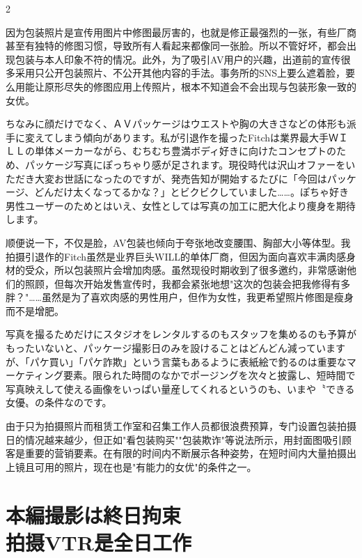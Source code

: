 \documentclass[12pt,UTF8]{ctexbook}
\begin{document}
\begin{paracol}{2}
\switchcolumn

因为包装照片是宣传用图片中修图最厉害的，也就是修正最强烈的一张，有些厂商甚至有独特的修图习惯，导致所有人看起来都像同一张脸。所以不管好坏，都会出现包装与本人印象不符的情况。此外，为了吸引AV用户的兴趣，出道前的宣传很多采用只公开包装照片、不公开其他内容的手法。事务所的SNS上要么遮着脸，要么用能让原形尽失的修图应用上传照片，根本不知道会不会出现与包装形象一致的女优。

\switchcolumn*

ちなみに顔だけでなく、ＡＶパッケージはウエストや胸の大きさなどの体形も派手に変えてしまう傾向があります。私が引退作を撮ったFitchは業界最大手ＷＩＬＬの単体メーカーながら、むちむち豊満ボディ好きに向けたコンセプトのため、パッケージ写真にぽっちゃり感が足されます。現役時代は沢山オファーをいただき大変お世話になったのですが、発売告知が開始するたびに「今回はパッケージ、どんだけ太くなってるかな？」とビクビクしていました……。ぽちゃ好き男性ユーザーのためとはいえ、女性としては写真の加工に肥大化より痩身を期待します。

\switchcolumn

顺便说一下，不仅是脸，AV包装也倾向于夸张地改变腰围、胸部大小等体型。我拍摄引退作的Fitch虽然是业界巨头WILL的单体厂商，但因为面向喜欢丰满肉感身材的受众，所以包装照片会增加肉感。虽然现役时期收到了很多邀约，非常感谢他们的照顾，但每次开始发售宣传时，我都会紧张地想"这次的包装会把我修得有多胖？"……虽然是为了喜欢肉感的男性用户，但作为女性，我更希望照片修图是瘦身而不是增肥。

\switchcolumn*

写真を撮るためだけにスタジオをレンタルするのもスタッフを集めるのも予算がもったいないと、パッケージ撮影日のみを設けることはどんどん減っていますが、「パケ買い」「パケ詐欺」という言葉もあるように表紙絵で釣るのは重要なマーケティング要素。限られた時間のなかでポージングを次々と披露し、短時間で写真映えして使える画像をいっぱい量産してくれるというのも、いまや〝できる女優〟の条件なのです。

\switchcolumn

由于只为拍摄照片而租赁工作室和召集工作人员都很浪费预算，专门设置包装拍摄日的情况越来越少，但正如"看包装购买""包装欺诈"等说法所示，用封面图吸引顾客是重要的营销要素。在有限的时间内不断展示各种姿势，在短时间内大量拍摄出上镜且可用的照片，现在也是"有能力的女优"的条件之一。

\end{paracol}

\section{本編撮影は終日拘束\\拍摄VTR是全日工作}
\end{document}
